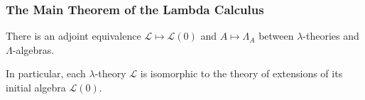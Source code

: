 \documentclass[aspectratio=169]{fancyslides} %
\begin{document}
  \begin{frame}
    \frametitle{The Main Theorem of the Lambda Calculus}
    \begin{theorem}
      There is an adjoint equivalence $ \mathcal L \mapsto \mathcal L(0) $ and $ A \mapsto \Lambda_A $ between $ \lambda $-theories and  $ \Lambda $-algebras.

      In particular, each $ \lambda $-theory $ \mathcal L $ is isomorphic to the theory of extensions of its initial algebra $ \mathcal L(0) $.
    \end{theorem}
  \end{frame}
\end{document}
